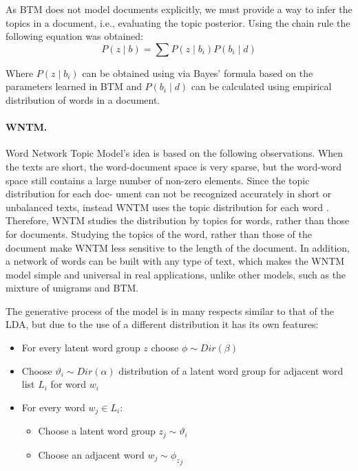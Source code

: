 As BTM does not model documents explicitly, we must provide a way to infer the topics in a document, i.e., evaluating the topic posterior. Using the chain rule the following equation was obtained:
\begin{equation}
	\label{eqn:29}
	P(z \mid b) = \sum P(z \mid b_i) P(b_i \mid d)
\end{equation}

Where \(P (z \mid b_i)\) can be obtained using via Bayes’ formula based on the parameters learned in BTM and \(P(b_i \mid d)\) can be calculated using empirical distribution of words in a document.

\paragraph{WNTM.} Word Network Topic Model’s idea is based on the following observations. When the texts are short, the word-document space is very sparse, but the word-word space still contains a large number of non-zero elements. Since the topic distribution for each doc- ument can not be recognized accurately in short or unbalanced texts, instead WNTM uses the topic distribution for each word \cite{KeYuanJichang}. Therefore, WNTM studies the distribution by topics for words, rather than those for documents. Studying the topics of the word, rather than those of the document make WNTM less sensitive to the length of the document. In addition, a network of words can be built with any type of text, which makes the WNTM model simple and universal in real applications, unlike other models, such as the mixture of unigrams \cite{ThrunMitchellNigam} and BTM.

The generative process of the model is in many respects similar to that of the LDA, but due to the use of a different distribution it has its own features:
\begin{itemize}
	\item For every latent word group \(z\) choose \(\phi \sim Dir(\beta)\)
	\item Choose \(\vartheta_i \sim \textit{Dir}(\alpha)\) distribution of a latent word group for adjacent word list \(L_i\) for word \(w_i\)
	\item For every word \(w_j \in L_i\):
	\begin{itemize}
		\item Choose a latent word group \(z_j \sim \vartheta_i\) 
		\item Choose an adjacent word \(w_j \sim {\phi_z}_j\)
	\end{itemize}
\end{itemize}

